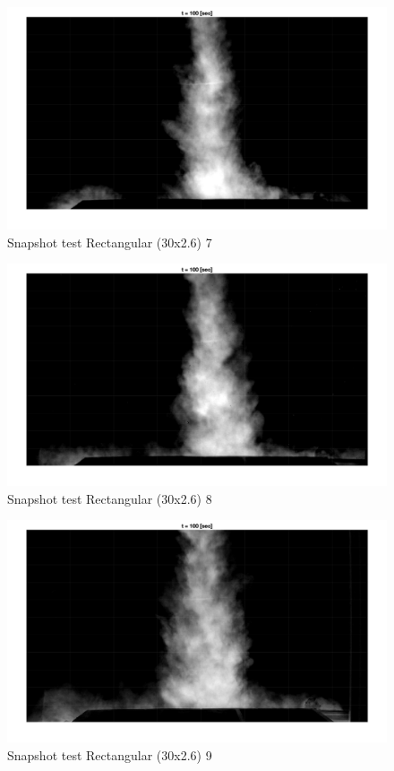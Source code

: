 \begin{figure}[ht!]
    \centering
    \includegraphics[width=\linewidth]{Images/Rec30_7_t100.jpg}
    \caption{Snapshot test Rectangular (30x2.6) 7}
\end{figure}

\begin{figure}[ht!]
    \centering
    \includegraphics[width=\linewidth]{Images/Rec30_8_t100.jpg}
    \caption{Snapshot test Rectangular (30x2.6) 8}
\end{figure}

\begin{figure}[ht!]
    \centering
    \includegraphics[width=\linewidth]{Images/Rec30_9_t100.jpg}
    \caption{Snapshot test Rectangular (30x2.6) 9}
\end{figure}

